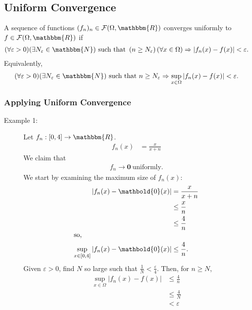 \documentclass[10pt]{extarticle}
\renewcommand{\mathbf}[1]{\mathbold{#1}}
\newcommand{\N}{\mathbbm{N}}
\newcommand{\R}{\mathbbm{R}}
\begin{document}
  \subsection{Uniform Convergence}%
    A sequence of functions $(f_n)_n\in \mathcal{F}(\Omega,\R)$ converges uniformly to $f\in \mathcal{F}(\Omega,\R)$ if
    \begin{align*}
      (\forall \varepsilon > 0)(\exists N_{\varepsilon}\in\N) \text{ such that } \left(n \geq N_{\varepsilon}\right)  (\forall x \in \Omega)\Rightarrow \left|f_n(x) - f(x)\right| < \varepsilon.
    \end{align*}
    Equivalently,
    \begin{align*}
      (\forall \varepsilon > 0)(\exists N_{\varepsilon}\in \N) \text{ such that } n\geq N_{\varepsilon} \Rightarrow \sup_{x\in\Omega}\left|f_n(x) - f(x)\right| < \varepsilon.
    \end{align*}
    \subsubsection{Applying Uniform Convergence}%
    \begin{description}
      \item[Example 1:] Let $f_n: [0,4] \rightarrow \R$.
        \begin{align*}
          f_n(x) &= \frac{x}{x+n}
        \end{align*}
        We claim that
        \begin{align*}
          f_n \rightarrow \mathbf{0}~\text{uniformly}.
        \end{align*}
        We start by examining the maximum size of $f_n(x)$:
        \begin{align*}
          \left|f_n(x) - \mathbf{0}(x)\right| &= \frac{x}{x+n}\\
                                              &\leq \frac{x}{n}\\
                                              &\leq \frac{4}{n}\\
                                              \shortintertext{so,}
          \sup_{x\in[0,4]}\left|f_n(x)-\mathbf{0}(x)\right|&\leq \frac{4}{n}.
        \end{align*}
        Given $\varepsilon > 0$, find $N$ so large such that $\frac{1}{N} < \frac{\varepsilon}{4}$. Then, for $n \geq N$,
        \begin{align*}
          \sup_{x\in\Omega}\left|f_n(x) - f(x) \right| &\leq \frac{4}{n}\\
                                                       &\leq \frac{4}{N}\\
                                                       &< \varepsilon
        \end{align*}
    \end{description}
\end{document}
